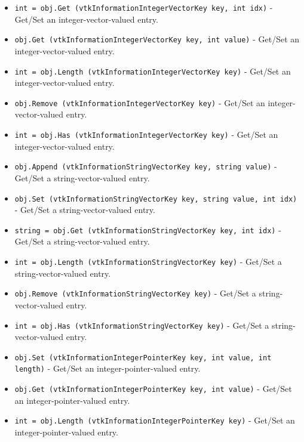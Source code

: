 \begin{itemize}
\item  \verb|int = obj.Get (vtkInformationIntegerVectorKey key, int idx)| -  Get/Set an integer-vector-valued entry.

\item  \verb|obj.Get (vtkInformationIntegerVectorKey key, int value)| -  Get/Set an integer-vector-valued entry.

\item  \verb|int = obj.Length (vtkInformationIntegerVectorKey key)| -  Get/Set an integer-vector-valued entry.

\item  \verb|obj.Remove (vtkInformationIntegerVectorKey key)| -  Get/Set an integer-vector-valued entry.

\item  \verb|int = obj.Has (vtkInformationIntegerVectorKey key)| -  Get/Set an integer-vector-valued entry.

\item  \verb|obj.Append (vtkInformationStringVectorKey key, string value)| -  Get/Set a string-vector-valued entry.

\item  \verb|obj.Set (vtkInformationStringVectorKey key, string value, int idx)| -  Get/Set a string-vector-valued entry.

\item  \verb|string = obj.Get (vtkInformationStringVectorKey key, int idx)| -  Get/Set a string-vector-valued entry.

\item  \verb|int = obj.Length (vtkInformationStringVectorKey key)| -  Get/Set a string-vector-valued entry.

\item  \verb|obj.Remove (vtkInformationStringVectorKey key)| -  Get/Set a string-vector-valued entry.

\item  \verb|int = obj.Has (vtkInformationStringVectorKey key)| -  Get/Set a string-vector-valued entry.

\item  \verb|obj.Set (vtkInformationIntegerPointerKey key, int value, int length)| -  Get/Set an integer-pointer-valued entry.

\item  \verb|obj.Get (vtkInformationIntegerPointerKey key, int value)| -  Get/Set an integer-pointer-valued entry.

\item  \verb|int = obj.Length (vtkInformationIntegerPointerKey key)| -  Get/Set an integer-pointer-valued entry.


\end{itemize}
